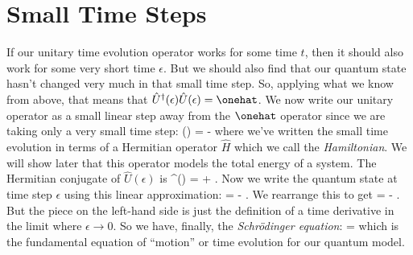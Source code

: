 \section{Small Time Steps}
\label{sec:scheqn}
If our unitary time evolution operator works for some time $t$, then it should also work for some very short time $\epsilon$. But we should also find that our quantum state hasn't changed very much in that small time step. So, applying what we know from above, that means that $\hat{U}^\dagger(\epsilon) \hat{U}(\epsilon) = \onehat$. We now write our unitary operator as a small linear step away from the $\onehat$ operator since we are taking only a very small time step:
\beq
{}(\epsilon) = \onehat -\frac{\I\epsilon}{\hbar} 
\eeq
where we've written the small time evolution in terms of a Hermitian operator $\hat{H}$ which we call the {\em Hamiltonian}. We will show later that this operator models the total energy of a system. The Hermitian conjugate of $\hat{U}(\epsilon)$ is
\beq
{}^\dagger(\epsilon) = \onehat +\frac{\I\epsilon}{\hbar} .
\eeq
Now we write the quantum state at time step $\epsilon$ using this linear approximation:
\beq
\ket{\Psi(\epsilon)} =  - \frac{\I\epsilon}{\hbar}  .
\eeq
We rearrange this to get
\beq
{}  = - \frac{\I}{\hbar}  .
\eeq
{}
But the piece on the left-hand side is just the definition of a time derivative in the limit where $\epsilon\rightarrow 0$. So we have, finally, the {\em Schr\"{o}dinger equation}: 
\beq
\I \hbar {}\ket{\Psi} = \ket{\Psi}
\label{eq:sch}
\eeq
which is the fundamental equation of ``motion'' or time evolution for our quantum model.

